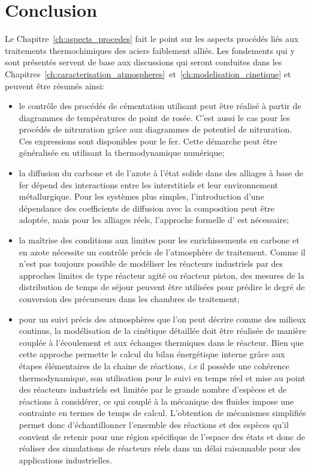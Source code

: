 \clearpage\section{Conclusion}

Le Chapitre~\ref{ch:aspects_procedes} fait le point sur les aspects procédés liés aux traitements thermochimiques des aciers faiblement alliés. Les fondements qui y sont présentés servent de base aux discussions qui seront conduites dans les Chapitres~\ref{ch:caracterisation_atmospheres}~et~\ref{ch:modelisation_cinetique} et peuvent être résumés ainsi:
\begin{itemize}
  \item le contrôle des procédés de cémentation utilisant  peut être réalisé à partir de diagrammes de températures de point de rosée. C'est aussi le cas pour les procédés de nitruration grâce aux diagrammes de potentiel de nitruration. Ces expressions sont disponibles pour le fer. Cette démarche peut être généralisée en utilisant la thermodynamique numérique;
  
  \item la diffusion du carbone et de l'azote à l'état solide dans des alliages à base de fer dépend des interactions entre les interstitiels et leur environnement métallurgique. Pour les systèmes plus simples, l'introduction d'une dépendance des coefficients de diffusion avec la composition peut être adoptée, mais pour les alliages \og{}réels\fg{}, l'approche formelle d'\citet{Onsager1931,Onsager1931ii} est nécessaire;
  
  \item la maîtrise des conditions aux limites pour les enrichissements en carbone et en azote nécessite un contrôle précis de l'atmosphère de traitement. Comme il n'est pas toujours possible de modéliser les réacteurs industriels par des approches limites de type réacteur \og{}agité\fg{} ou réacteur \og{}piston\fg{}, des mesures de la distribution de temps de séjour peuvent être utilisées pour prédire le degré de conversion des précurseurs dans les chambres de traitement;
  
  \item pour un suivi précis des atmosphères que l'on peut décrire comme des milieux continus, la modélisation de la cinétique détaillée doit être réalisée de manière couplée à l'écoulement et aux échanges thermiques dans le réacteur. Bien que cette approche permette le calcul du bilan énergétique interne grâce aux étapes élémentaires de la chaine de réactions, \emph{i.e} il possède une cohérence thermodynamique, son utilisation pour le suivi en temps réel et mise au point des réacteurs industriels est limitée par le grande nombre d'espèces et de réactions à considérer, ce qui couplé à la mécanique des fluides impose une contrainte en termes de temps de calcul. L'obtention de mécanismes simplifiés permet donc d'échantillonner l'ensemble des réactions et des espèces qu'il convient de retenir pour une région spécifique de l'espace des états et donc de réaliser des simulations de réacteurs réels dans un délai raisonnable pour des applications industrielles.  
\end{itemize}

\endinput